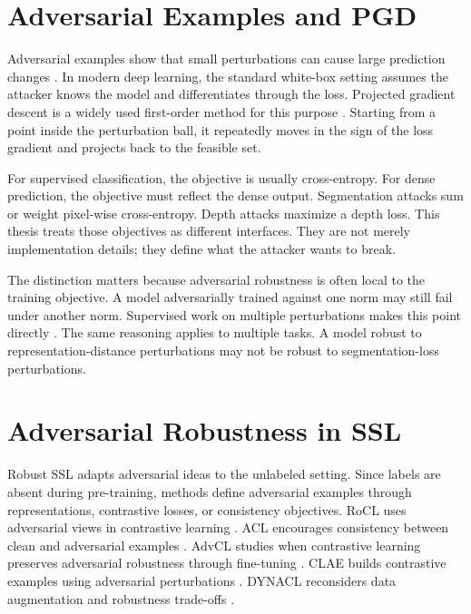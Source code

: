\section{Adversarial Examples and PGD}

Adversarial examples show that small perturbations can cause large prediction changes \parencite{biggio2013evasion,szegedy2014intriguing}. In modern deep learning, the standard white-box setting assumes the attacker knows the model and differentiates through the loss. Projected gradient descent is a widely used first-order method for this purpose \parencite{madry2018towards}. Starting from a point inside the perturbation ball, it repeatedly moves in the sign of the loss gradient and projects back to the feasible set.

For supervised classification, the objective is usually cross-entropy. For dense prediction, the objective must reflect the dense output. Segmentation attacks sum or weight pixel-wise cross-entropy. Depth attacks maximize a depth loss. This thesis treats those objectives as different interfaces. They are not merely implementation details; they define what the attacker wants to break.

The distinction matters because adversarial robustness is often local to the training objective. A model adversarially trained against one norm may still fail under another norm. Supervised work on multiple perturbations makes this point directly \parencite{tramer2019adversarial}. The same reasoning applies to multiple tasks. A model robust to representation-distance perturbations may not be robust to segmentation-loss perturbations.

\section{Adversarial Robustness in SSL}

Robust SSL adapts adversarial ideas to the unlabeled setting. Since labels are absent during pre-training, methods define adversarial examples through representations, contrastive losses, or consistency objectives. RoCL uses adversarial views in contrastive learning \parencite{kim2020adversarial}. ACL encourages consistency between clean and adversarial examples \parencite{jiang2020robust}. AdvCL studies when contrastive learning preserves adversarial robustness through fine-tuning \parencite{fan2021does}. CLAE builds contrastive examples using adversarial perturbations \parencite{ho2020CLAE}. DYNACL reconsiders data augmentation and robustness trade-offs \parencite{luo2023rethinking}.

